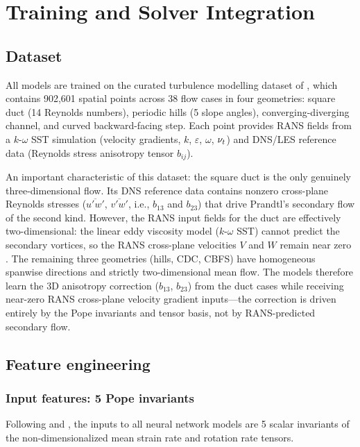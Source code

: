 \section{Training and Solver Integration}
\label{sec:training}

\subsection{Dataset}

All models are trained on the curated turbulence modelling dataset of \citet{McConkey2021}, which contains 902{,}601 spatial points across 38 flow cases in four geometries: square duct (14 Reynolds numbers), periodic hills (5 slope angles), converging-diverging channel, and curved backward-facing step.
Each point provides RANS fields from a $k$-$\omega$ SST \citep{Menter1994} simulation (velocity gradients, $k$, $\varepsilon$, $\omega$, $\nu_t$) and DNS/LES reference data (Reynolds stress anisotropy tensor $b_{ij}$).

An important characteristic of this dataset: the square duct is the only genuinely three-dimensional flow.
Its DNS reference data \citep{Pinelli2010} contains nonzero cross-plane Reynolds stresses ($\overline{u'w'}$, $\overline{v'w'}$, i.e., $b_{13}$ and $b_{23}$) that drive Prandtl's secondary flow of the second kind.
However, the RANS input fields for the duct are effectively two-dimensional: the linear eddy viscosity model ($k$-$\omega$ SST) cannot predict the secondary vortices, so the RANS cross-plane velocities $V$ and $W$ remain near zero \citep{McConkey2021}.
The remaining three geometries (hills, CDC, CBFS) have homogeneous spanwise directions and strictly two-dimensional mean flow.
The models therefore learn the 3D anisotropy correction ($b_{13}$, $b_{23}$) from the duct cases while receiving near-zero RANS cross-plane velocity gradient inputs---the correction is driven entirely by the Pope invariants and tensor basis, not by RANS-predicted secondary flow.

\subsection{Feature engineering}
\label{sec:features}

\subsubsection{Input features: 5 Pope invariants}

Following \citet{Ling2016} and \citet{Pope1975}, the inputs to all neural network models are 5 scalar invariants of the non-dimensionalized mean strain rate and rotation rate tensors.


